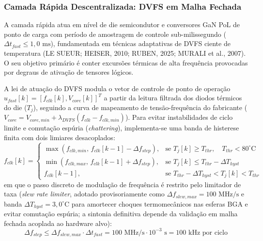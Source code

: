 \subsubsection{Camada Rápida Descentralizada: DVFS em Malha Fechada}

A camada rápida atua em nível de die semicondutor e conversores GaN PoL de ponto de carga com período de amostragem de controle sub-milissegundo ($\Delta t_{fast} \le 1{,}0\text{ ms}$), fundamentada em técnicas adaptativas de DVFS ciente de temperatura (LE SUEUR; HEISER, 2010; RUBEN, 2025; MURALI et al., 2007). O seu objetivo primário é conter excursões térmicas de alta frequência provocadas por degraus de ativação de tensores lógicos.

A lei de atuação do DVFS modula o vetor de controle de ponto de operação $u_{fast}[k] = [f_{clk}[k], V_{core}[k]]^T$ a partir da leitura filtrada dos diodos térmicos do die ($T_j$), seguindo a curva de mapeamento de tensão-frequência do fabricante ($V_{core} = V_{core,min} + \lambda_{DVFS} (f_{clk} - f_{clk,min})$). Para evitar instabilidades de ciclo limite e comutação espúria (\textit{chattering}), implementa-se uma banda de histerese finita com dois limiares desacoplados:
\begin{equation}
    f_{clk}[k] = 
    \begin{cases}
        \max\left( f_{clk,min}, \, f_{clk}[k-1] - \Delta f_{step} \right), & \text{se } T_j[k] \ge T_{thr}, \quad T_{thr}<80^\circ\text{C} \\[0.2cm]
        \min\left( f_{clk,max}, \, f_{clk}[k-1] + \Delta f_{step} \right), & \text{se } T_j[k] \le T_{thr} - \Delta T_{hyst} \\[0.2cm]
        f_{clk}[k-1], & \text{se } T_{thr} - \Delta T_{hyst} < T_j[k] < T_{thr}
    \end{cases}
    \label{eq:dvfs_histerese_antichattering}
\end{equation}
em que o passo discreto de modulação de frequência é restrito pelo limitador de taxa (\textit{slew rate limiter}, adotado provisoriamente como $\Delta f_{slew,max} = 100\text{ MHz/s}$ e banda $\Delta T_{hyst} = 3{,}0^\circ\text{C}$ para amortecer choques termomecânicos nas esferas BGA e evitar comutação espúria; a sintonia definitiva depende da validação em malha fechada acoplada ao hardware alvo):
\begin{equation}
    \Delta f_{step} \le \Delta f_{slew,max} \cdot \Delta t_{fast} = 100\text{ MHz/s} \cdot 10^{-3}\text{ s} = 100\text{ kHz por ciclo}
\end{equation}

